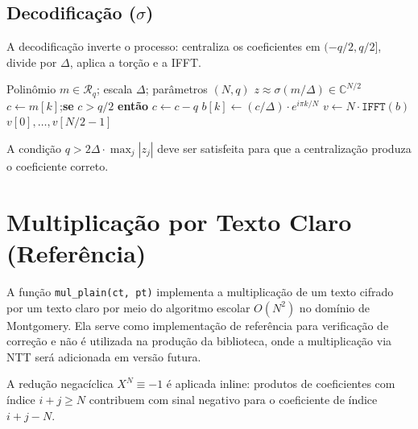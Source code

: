 \documentclass[11pt,a4paper]{report}
\newcommand{\Rq}{\mathcal{R}_q}
\begin{document}
\section{Decodificação ($\sigma$)}
\label{sec:decode}

A decodificação inverte o processo: centraliza os coeficientes em $(-q/2, q/2]$, divide
por $\Delta$, aplica a torção e a IFFT.

\begin{algorithm}[ht]
\caption{\texttt{decode}: decodificação canônica CKKS}
\label{alg:decode}
\begin{algorithmic}[1]
\Require Polinômio $m \in \Rq$;\; escala $\Delta$;\; parâmetros $(N, q)$
\Ensure $z \approx \sigma(m/\Delta) \in \mathbb{C}^{N/2}$
  \State $c \gets m[k]$;\quad \textbf{se} $c > q/2$ \textbf{então} $c \gets c - q$
    \Comment{Centraliza em $(-q/2,\, q/2]$}
  \State $b[k] \gets (c / \Delta) \cdot e^{i\pi k/N}$
\EndFor
\State $v \gets N \cdot \texttt{IFFT}(b)$
\State \Return $v[0], \ldots, v[N/2-1]$
\end{algorithmic}
\end{algorithm}

A condição $q > 2\Delta \cdot \max_j |z_j|$ deve ser satisfeita para que a
centralização produza o coeficiente correto.

\chapter{Multiplicação por Texto Claro (Referência)}
\label{cap:mul_plain}

A função \texttt{mul\_plain(ct, pt)} implementa a multiplicação de um texto cifrado
por um texto claro por meio do algoritmo escolar $O(N^2)$ no domínio de Montgomery.
Ela serve como implementação de referência para verificação de correção e não é
utilizada na produção da biblioteca, onde a multiplicação via NTT será adicionada
em versão futura.

A redução negacíclica $X^N \equiv -1$ é aplicada inline: produtos de coeficientes com
índice $i+j \geq N$ contribuem com sinal negativo para o coeficiente de índice $i+j-N$.
\end{document}
